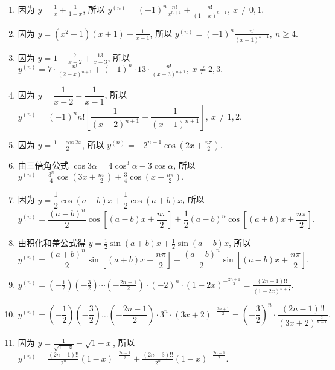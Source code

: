 \begin{solution}
    \begin{enumerate}[label=(\arabic{*})]
        \item 因为 $\displaystyle y=\frac{1}{x}+\frac{1}{1-x}$, 所以 $\displaystyle y^{(n)}=(-1)^n\frac{n!}{x^{n+1}}+\frac{n!}{(1-x)^{n+1}},~x\not=0,1.$
        \item 因为 $\displaystyle y=(x^2+1)(x+1)+\frac{1}{x-1}$, 所以 $\displaystyle y^{(n)}=(-1)^n\frac{n!}{(x-1)^{n+1}},~n\geqslant 4.$
        \item 因为 $\displaystyle y=1-\frac{7}{x-2}+\frac{13}{x-3}$, 所以 $\displaystyle y^{(n)}=7\cdot\frac{n!}{(2-x)^{n+1}}+(-1)^n\cdot13\cdot\frac{n!}{(x-3)^{n+1}},~x\not=2,3.$
        \item 因为 $y=\dfrac{1}{x-2}-\dfrac{1}{x-1}$, 所以 $y^{(n) }=(-1) ^{n}n!\left[ \dfrac{1}{\left( x-2\right) ^{n+1}}-\dfrac{1}{\left( x-1\right) ^{n+1}}\right],~ x\neq  1,2. $
        \item 因为 $\displaystyle y=\frac{1-\cos2x}{2}$, 所以 $\displaystyle y^{(n)}=-2^{n-1}\cos\left(2x+\frac{n\pi}{2}\right).$
        \item 由三倍角公式 $\cos 3\alpha=4\cos^3\alpha-3\cos\alpha$, 所以 $\displaystyle y^{(n)}=\frac{3^n}{4}\cos\left(3x+\frac{n\pi}{2}\right)+\frac{3}{4}\cos\left(x+\frac{n\pi}{2}\right).$
        \item 因为 $y=\dfrac{1}{2}\cos (a-b)  x+\dfrac{1}{2}\cos \left( a+b\right) x$, 所以
              $$y^{(n)} =\dfrac{(a-b)  ^{n}}{2}\cos \left[ (a-b)  x+\dfrac{n\pi }{2}\right] +\dfrac{1}{2}(a-b)  ^{n}\cos \left[ \left( a+b\right) x+\dfrac{n\pi }{2}\right] .$$
        \item 由积化和差公式得 $\displaystyle y=\frac{1}{2}\sin(a+b)x+\frac{1}{2}\sin(a-b)x$, 所以 $$ y^{(n)}=\frac{(a+b)^n}{2}\sin\left[(a+b)x+\frac{n\pi}{2}\right]+\frac{(a-b)^n}{2}\sin\left[(a-b)x+\frac{n\pi}{2}\right].$$
        \item $\displaystyle y^{(n)}=\left(-\frac{1}{2}\right)\left(-\frac{3}{2}\right)\cdots\left(-\frac{2n-1}{2}\right)\cdot(-2)^n\cdot(1-2x)^{-\frac{2n+1}{2}}=\frac{(2n-1)!!}{(1-2x)^{n+\frac{1}{2}}}.$
        \item $y^{(n)} =\left( -\dfrac{1}{2}\right) \left( -\dfrac{3}{2}\right) \ldots \left( -\dfrac{2n-1}{2}\right) \cdot 3^{n}\cdot \left( 3x+2\right) ^{-\frac{2n+1}{2}}=\left( -\dfrac{3}{2}\right) ^{n}\cdot\dfrac{\left( 2n-1\right) !!}{\left( 3x+2\right) ^{\frac{2}{n+1}}}.$
        \item 因为 $\displaystyle y=\frac{1}{\sqrt{1-x}}-\sqrt{1-x}$, 所以 $\displaystyle y^{(n)}=\frac{(2n-1)!!}{2^n}(1-x)^{-\frac{2n+1}{2}}+\frac{(2n-3)!!}{2^n}(1-x)^{-\frac{2n-1}{2}}.$

\end{enumerate}
\end{solution}
